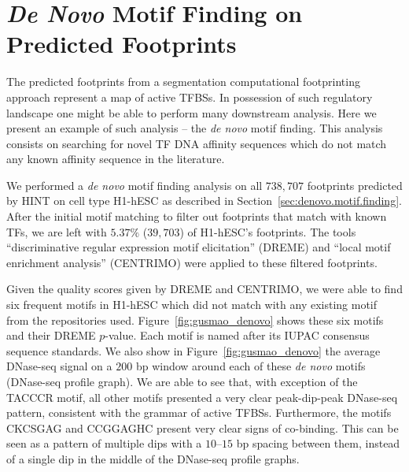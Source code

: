 \vspace{1cm}

\section{\emph{De Novo} Motif Finding on Predicted Footprints}
\label{sec:denovo.motif.finding.footprints}

The predicted footprints from a segmentation computational footprinting approach represent a map of active TFBSs. In possession of such regulatory landscape one might be able to perform many downstream analysis. Here we present an example of such analysis -- the \emph{de novo} motif finding. This analysis consists on searching for novel TF DNA affinity sequences which do not match any known affinity sequence in the literature.

We performed a \emph{de novo} motif finding analysis on all $738,707$ footprints predicted by HINT on cell type H1-hESC as described in Section~\ref{sec:denovo.motif.finding}. After the initial motif matching to filter out footprints that match with known TFs, we are left with \approxy$5.37\%$ ($39,703$) of H1-hESC's footprints. The tools ``discriminative regular expression motif elicitation'' (DREME) and ``local motif enrichment analysis'' (CENTRIMO) were applied to these filtered footprints.

Given the quality scores given by DREME and CENTRIMO, we were able to find six frequent motifs in H1-hESC which did not match with any existing motif from the repositories used. Figure~\ref{fig:gusmao_denovo} shows these six motifs and their DREME $p$-value. Each motif is named after its IUPAC consensus sequence standards. We also show in Figure~\ref{fig:gusmao_denovo} the average DNase-seq signal on a $200$ bp window around each of these \emph{de novo} motifs (DNase-seq profile graph). We are able to see that, with exception of the TACCCR motif, all other motifs presented a very clear peak-dip-peak DNase-seq pattern, consistent with the grammar of active TFBSs. Furthermore, the motifs CKCSGAG and CCGGAGHC present very clear signs of co-binding. This can be seen as a pattern of multiple dips with a $10$--$15$ bp spacing between them, instead of a single dip in the middle of the DNase-seq profile graphs.


